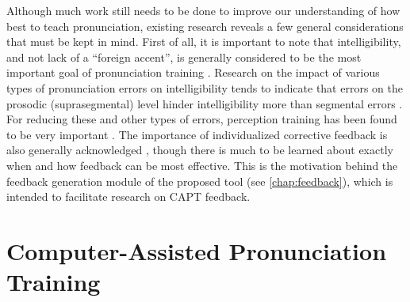 
Although much work still needs to be done to improve our understanding of how best to teach pronunciation, existing research reveals a few general considerations that must be kept in mind.
	First of all, it is important to note that 
intelligibility, and not lack of a ``foreign accent'', is generally considered to be the most important goal of pronunciation training \citep{Neri2002,Derwing2005,Witt2012}.
	Research on the impact of various types of pronunciation errors on intelligibility tends to indicate that errors on the prosodic (suprasegmental) level hinder intelligibility more than segmental errors \citep{Anderson-Hsieh1992,Derwing2005,Hirschfeld2007,Dlaska2013}. 
	For reducing these and other types of errors,
perception training 
has been found to be very important \citep{Derwing2005,Hirschfeld2007}.
The importance of individualized corrective feedback is also generally acknowledged \citep{Neri2002,Mehlhorn2005,Dlaska2013}, though there is much to be learned about exactly when and how feedback can be most effective. This is the motivation behind the feedback generation module of the proposed tool (see \cref{chap:feedback}), which is intended to facilitate research on CAPT feedback.





\section{Computer-Assisted Pronunciation Training} %
\label{sec:bkgd:capt}

